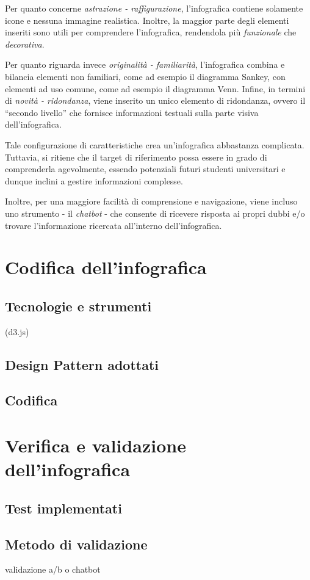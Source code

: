 Per quanto concerne \emph{astrazione - raffigurazione}, l'infografica contiene solamente icone e nessuna immagine realistica. Inoltre, la maggior parte degli elementi
inseriti sono utili per comprendere l'infografica, rendendola più \emph{funzionale} che \emph{decorativa}.

Per quanto riguarda invece \emph{originalità - familiarità}, l'infografica combina e bilancia elementi non familiari, come ad esempio il diagramma Sankey, con elementi
ad uso comune, come ad esempio il diagramma Venn. 
Infine, in termini di \emph{novità - ridondanza}, viene inserito un unico elemento di ridondanza, ovvero il ``secondo livello'' che fornisce informazioni testuali sulla parte visiva 
dell'infografica.

\bigskip
\noindent Tale configurazione di caratteristiche crea un'infografica abbastanza complicata. Tuttavia, si ritiene che il target di riferimento possa essere in grado di comprenderla agevolmente, essendo 
potenziali futuri studenti universitari e dunque inclini a gestire informazioni complesse. 

Inoltre, per una maggiore facilità di comprensione e navigazione, viene incluso uno strumento - il \emph{chatbot} - che consente di ricevere risposta ai propri dubbi e/o 
trovare l'informazione ricercata all'interno dell'infografica.

\section{Codifica dell'infografica}
\subsection{Tecnologie e strumenti}\label{subsec:tecnologie}
(d3.js)
\subsection{Design Pattern adottati}
\subsection{Codifica}



\section{Verifica e validazione dell'infografica}
\subsection{Test implementati}
\subsection{Metodo di validazione}
validazione a/b o chatbot


